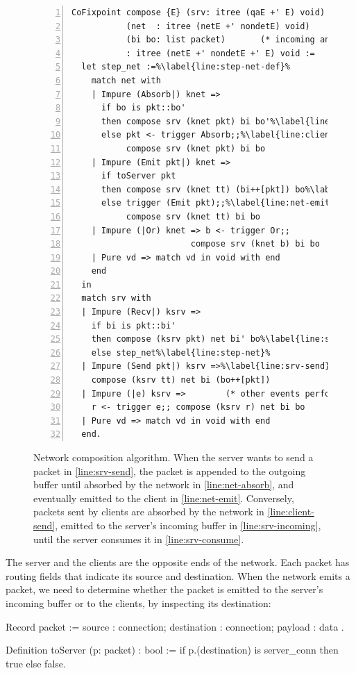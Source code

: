 \begin{figure}
\begin{lstlisting}[style=customcoq,numbers=left,escapechar=\%]
CoFixpoint compose {E} (srv: itree (qaE +' E) void)   (* server  model *)
           (net  : itree (netE +' nondetE) void)      (* network model *)
           (bi bo: list packet)       (* incoming and outgoing buffers *)
           : itree (netE +' nondetE +' E) void :=
  let step_net :=%\label{line:step-net-def}%
    match net with
    | Impure (Absorb|) knet =>
      if bo is pkt::bo'
      then compose srv (knet pkt) bi bo'%\label{line:net-absorb}%
      else pkt <- trigger Absorb;;%\label{line:client-send}%
           compose srv (knet pkt) bi bo
    | Impure (Emit pkt|) knet =>
      if toServer pkt
      then compose srv (knet tt) (bi++[pkt]) bo%\label{line:srv-incoming}%
      else trigger (Emit pkt);;%\label{line:net-emit}%
           compose srv (knet tt) bi bo
    | Impure (|Or) knet => b <- trigger Or;;
                        compose srv (knet b) bi bo
    | Pure vd => match vd in void with end
    end
  in
  match srv with
  | Impure (Recv|) ksrv =>
    if bi is pkt::bi'
    then compose (ksrv pkt) net bi' bo%\label{line:srv-consume}%
    else step_net%\label{line:step-net}%
  | Impure (Send pkt|) ksrv =>%\label{line:srv-send}%
    compose (ksrv tt) net bi (bo++[pkt])
  | Impure (|e) ksrv =>        (* other events performed by the server *)
    r <- trigger e;; compose (ksrv r) net bi bo
  | Pure vd => match vd in void with end
  end.
\end{lstlisting}
\caption[Network composition algorithm]{Network composition algorithm.  When the
  server wants to send a packet in \autoref{line:srv-send}, the packet is
  appended to the outgoing buffer until absorbed by the network in
  \autoref{line:net-absorb}, and eventually emitted to the client in
  \autoref{line:net-emit}.  Conversely, packets sent by clients are absorbed by
  the network in \autoref{line:client-send}, emitted to the server's incoming
  buffer in \autoref{line:srv-incoming}, until the server consumes it in
  \autoref{line:srv-consume}.}
\label{fig:net-compose-code}
\end{figure}

The server and the clients are the opposite ends of the network.  Each packet
has routing fields that indicate its source and destination.  When the network
emits a packet, we need to determine whether the packet is emitted to the
server's incoming buffer or to the clients, by inspecting its destination:
\begin{coq}
  Record packet := {
    source      : connection;
    destination : connection;
    payload     : data
  }.

  Definition toServer (p: packet) : bool :=
    if p.(destination) is server_conn then true else false.
\end{coq}

